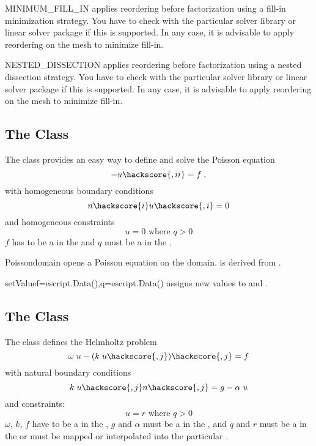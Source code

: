 \begin{memberdesc}[LinearPDE]{MINIMUM_FILL_IN}
applies reordering before factorization using a fill-in minimization strategy. You have to check with the particular solver library or
linear solver package if this is supported. In any case, it is advisable to apply reordering on the mesh to minimize fill-in.
\end{memberdesc}

\begin{memberdesc}[LinearPDE]{NESTED_DISSECTION}
applies reordering before factorization using a nested dissection strategy. You have to check with the particular solver library or
linear solver package if this is supported. In any case, it is advisable to apply reordering on the mesh to minimize fill-in.
\end{memberdesc}

\subsection{The \Poisson Class}
The \Poisson class provides an easy way to define and solve the Poisson
equation
\begin{equation}\label{POISSON.1}
-u\hackscore{,ii}=f\; .
\end{equation}
with homogeneous boundary conditions
\begin{equation}\label{POISSON.2}
n\hackscore{i}u\hackscore{,i}=0
\end{equation}
and homogeneous constraints
\begin{equation}\label{POISSON.3}
u=0 \mbox{ where } q>0
\end{equation}
$f$ has to be a \Scalar in the \Function and $q$ must be
a \Scalar in  the \SolutionFS.

\begin{classdesc}{Poisson}{domain}
opens a Poisson equation on the \Domain domain. \Poisson is derived from \LinearPDE.
\end{classdesc}
\begin{methoddesc}[Poisson]{setValue}{f=escript.Data(),q=escript.Data()}
assigns new values to  and .
\end{methoddesc}

\subsection{The \Helmholtz Class}
The \Helmholtz class defines the Helmholtz problem
\begin{equation}\label{HZ.1}
\omega \; u - (k\; u\hackscore{,j})\hackscore{,j} = f
\end{equation}
 with natural boundary conditions
\begin{equation}\label{HZ.2}
k\; u\hackscore{,j} n\hackscore{,j} = g- \alpha \; u 
\end{equation}
and constraints:
\begin{equation}\label{HZ.3}
u=r \mbox{ where } q>0
\end{equation}
$\omega$, $k$, $f$ have to be a \Scalar in the \Function,
$g$ and $\alpha$ must be a \Scalar in  the \FunctionOnBoundary,
and $q$ and $r$ must be a \Scalar in  the \SolutionFS or must be mapped or interpolated into the particular \FunctionSpace.

